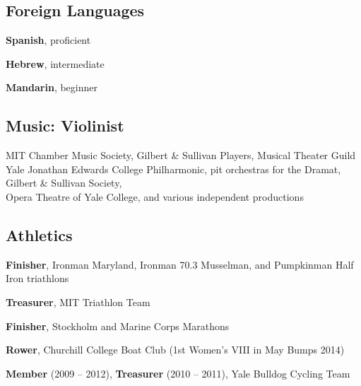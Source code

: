 \subsection{Foreign Languages}
{}{\textbf{Spanish}, proficient}{}

{}{\textbf{Hebrew}, intermediate}{}

{}{\textbf{Mandarin}, beginner}{}

\vspace{-2mm}
\subsection{Music: Violinist}
{MIT}
{Chamber Music Society, Gilbert \& Sullivan Players, Musical Theater Guild}{}
{Yale}
{Jonathan Edwards College Philharmonic, pit orchestras for the Dramat, Gilbert \& Sullivan Society,\\Opera Theatre of Yale College, and various independent productions}{}

\vspace{-2mm}
\subsection{Athletics}
{}{\textbf{Finisher}, Ironman Maryland, Ironman 70.3 Musselman, and Pumpkinman Half Iron triathlons}{}

{}{\textbf{Treasurer}, MIT Triathlon Team}{}

{}{\textbf{Finisher}, Stockholm and Marine Corps Marathons}{}

{}{\textbf{Rower}, Churchill College Boat Club (1st Women's VIII in May Bumps 2014)}{}

{}{\textbf{Member} (2009 -- 2012), \textbf{Treasurer} (2010 -- 2011), Yale Bulldog Cycling Team}{}
